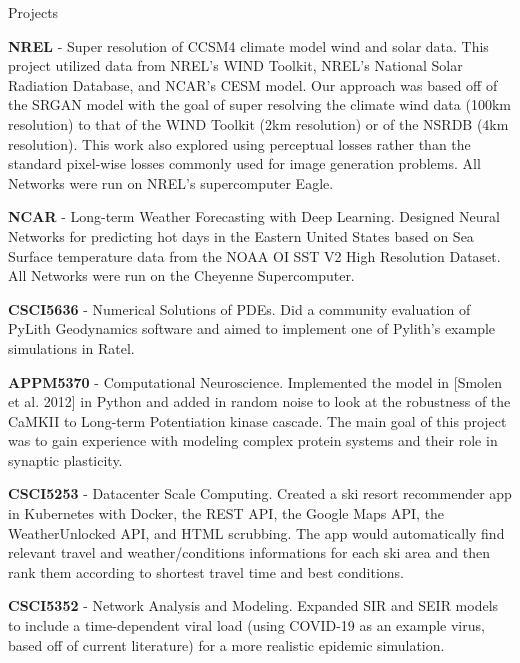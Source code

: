 \documentclass{resume} %
\begin{document}
\fi
\iftrue
\begin{rSection}{Projects}

\setlength \itemsep{-0.4em}
\textbf{NREL} - Super resolution of CCSM4 climate model wind and solar data. This project utilized data from NREL's WIND Toolkit, NREL's National Solar Radiation Database, and NCAR's CESM model. Our approach was based off of the SRGAN model with the goal of super resolving the climate wind data (100km resolution) to that of the WIND Toolkit (2km resolution) or of the NSRDB (4km resolution). This work also explored using perceptual losses rather than the standard pixel-wise losses commonly used for image generation problems. All Networks were run on NREL's supercomputer Eagle. %

\textbf{NCAR} - Long-term Weather Forecasting with Deep Learning. Designed Neural Networks for predicting hot days in the Eastern United States based on Sea Surface temperature data from the NOAA OI SST V2 High Resolution Dataset. All Networks were run on the Cheyenne Supercomputer.

\textbf{CSCI5636} - Numerical Solutions of PDEs. Did a community evaluation of PyLith Geodynamics software and aimed to implement one of Pylith's example simulations in Ratel.

\textbf{APPM5370} - Computational Neuroscience. Implemented the model in [Smolen et al. 2012] in Python and added in random noise to look at the robustness of the CaMKII to Long-term Potentiation kinase cascade. The main goal of this project was to gain experience with modeling complex protein systems and their role in synaptic plasticity.

\textbf{CSCI5253} - Datacenter Scale Computing. Created a ski resort recommender app in Kubernetes with Docker, the REST API, the Google Maps API, the WeatherUnlocked API, and HTML scrubbing. The app would automatically find relevant travel and weather/conditions informations for each ski area and then rank them according to shortest travel time and best conditions.

\textbf{CSCI5352} - Network Analysis and Modeling. Expanded SIR and SEIR models to include a time-dependent viral load (using COVID-19 as an example virus, based off of current literature) for a more realistic epidemic simulation.


\end{rSection}
\end{document}
